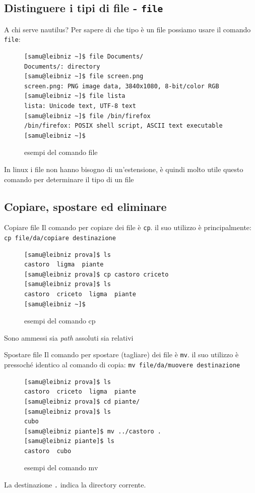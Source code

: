 \documentclass{beamer}
\begin{document}
  \subsection{Distinguere i tipi di file - \texttt{file}}
\begin{frame}[fragile]{A chi serve nautilus?}
  Per sapere di che tipo è un file possiamo usare il comando \texttt{file}:
  \begin{figure}
    \begin{lstlisting}[basicstyle=\footnotesize]
[samu@leibniz ~]$ file Documents/
Documents/: directory
[samu@leibniz ~]$ file screen.png
screen.png: PNG image data, 3840x1080, 8-bit/color RGB
[samu@leibniz ~]$ file lista
lista: Unicode text, UTF-8 text
[samu@leibniz ~]$ file /bin/firefox
/bin/firefox: POSIX shell script, ASCII text executable
[samu@leibniz ~]$
    \end{lstlisting}
    \caption{esempi del comando file}
  \end{figure}
  In linux i file non hanno bisogno di un'estensione, è quindi molto utile 
  questo comando per determinare il tipo di un file
\end{frame}

\subsection{Copiare, spostare ed eliminare}
\begin{frame}[fragile]{Copiare file}
  Il comando per copiare dei file è \texttt{cp}. il suo utilizzo è 
  principalmente: \texttt{cp file/da/copiare destinazione}
  \begin{figure}
    \begin{lstlisting}[basicstyle=\small]
[samu@leibniz prova]$ ls
castoro  ligma  piante
[samu@leibniz prova]$ cp castoro criceto
[samu@leibniz prova]$ ls
castoro  criceto  ligma  piante
[samu@leibniz ~]$
    \end{lstlisting}
    \caption{esempi del comando cp}
  \end{figure}
  Sono ammessi sia \textit{path} assoluti sia relativi
\end{frame}

\begin{frame}[fragile]{Spostare file}
  Il comando per spostare (tagliare) dei file è \texttt{mv}. il suo utilizzo è 
  pressoché identico al comando di copia: \texttt{mv file/da/muovere 
  destinazione}
  \begin{figure}
    \begin{lstlisting}[basicstyle=\small]
[samu@leibniz prova]$ ls
castoro  criceto  ligma  piante
[samu@leibniz prova]$ cd piante/
[samu@leibniz prova]$ ls
cubo
[samu@leibniz piante]$ mv ../castoro .
[samu@leibniz piante]$ ls
castoro  cubo
    \end{lstlisting}
    \caption{esempi del comando mv}
  \end{figure}
  La destinazione \texttt{.} indica la directory corrente.
\end{frame}
\end{document}
